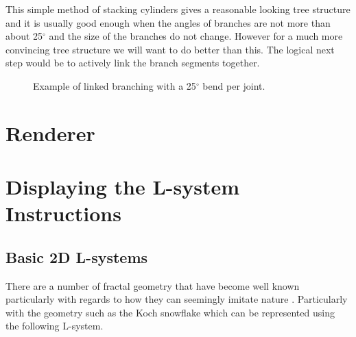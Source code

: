 \begin{flushleft}
\FloatBarrier

\vspace{5mm}


\vspace{5mm}

This simple method of stacking cylinders gives a reasonable looking tree structure and it is usually good enough when the angles of branches are not more than about 25$^{\circ}$ and the size of the branches do not change. However for a much more convincing tree structure we will want to do better than this. The logical next step would be to actively link the branch segments together.

\FloatBarrier

\begin{figure}[htbp]
	{\centering
		\vspace{7px}
		\setlength{\fboxrule}{1pt}
		\caption{Example of linked branching with a 25$^{\circ}$ bend per joint.}
	}
\end{figure}

\FloatBarrier

\end{flushleft}

\section{Renderer}

\begin{flushleft}


\end{flushleft}

\section{Displaying the L-system Instructions} \label{Display L-system Instructions}

\subsection{Basic 2D L-systems} 

There are a number of fractal geometry that have become well known particularly with regards to how they can seemingly imitate nature \cite{mandelbrot1982fractal}. Particularly with the geometry such as the Koch snowflake which can be represented using the following L-system.

